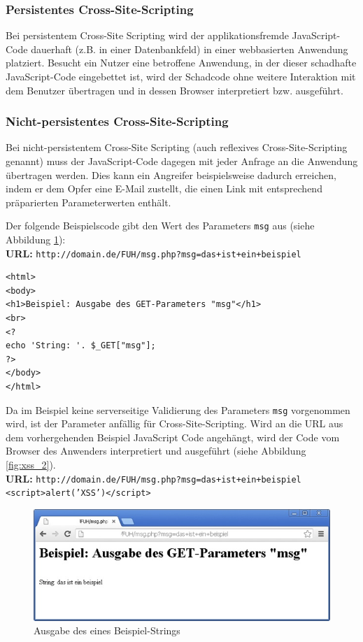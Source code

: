 \subsubsection{Persistentes Cross-Site-Scripting}

Bei persistentem Cross-Site Scripting wird der applikationsfremde JavaScript-Code dauerhaft (z.B. in einer Datenbankfeld) in einer webbasierten Anwendung platziert. Besucht ein Nutzer eine betroffene Anwendung, in der dieser schadhafte JavaScript-Code eingebettet ist, wird der Schadcode ohne weitere Interaktion mit dem Benutzer übertragen und in dessen Browser interpretiert bzw. ausgeführt.

\subsubsection{Nicht-persistentes Cross-Site-Scripting}

Bei nicht-persistentem Cross-Site Scripting (auch reflexives Cross-Site-Scripting genannt) muss der JavaScript-Code dagegen mit jeder Anfrage an die Anwendung übertragen werden. Dies kann ein Angreifer beispielsweise dadurch erreichen, indem er dem Opfer eine E-Mail zustellt, die einen Link mit entsprechend präparierten Parameterwerten enthält.


Der folgende Beispielscode gibt den Wert des Parameters \texttt{msg} aus (siehe Abbildung \ref{fig:xss_1}):
\\
\textbf{URL:} \texttt{http://domain.de/FUH/msg.php?msg=das+ist+ein+beispiel}

\begin{lstlisting}[basicstyle=\ttfamily\footnotesize]
<html>
<body>
<h1>Beispiel: Ausgabe des GET-Parameters "msg"</h1>
<br>
<?
echo 'String: '. $_GET["msg"];
?>
</body>
</html>
\end{lstlisting}

Da im Beispiel keine serverseitige Validierung des Parameters \texttt{msg} vorgenommen wird, ist der Parameter anfällig für Cross-Site-Scripting. Wird an die URL aus dem vorhergehenden Beispiel JavaScript Code angehängt, wird der Code vom Browser des Anwenders interpretiert und ausgeführt (siehe Abbildung \ref{fig:xss_2}).
\\
\textbf{URL:} \texttt{http://domain.de/FUH/msg.php?msg=das+ist+ein+beispiel\\<script>alert('XSS')</script>}

\begin{figure}[htbp]
 \centering
 \includegraphics[scale=.75]{abbildungen/xss_1}
 \caption{Ausgabe des eines Beispiel-Strings}
 \label{fig:xss_1} 
\end{figure}

